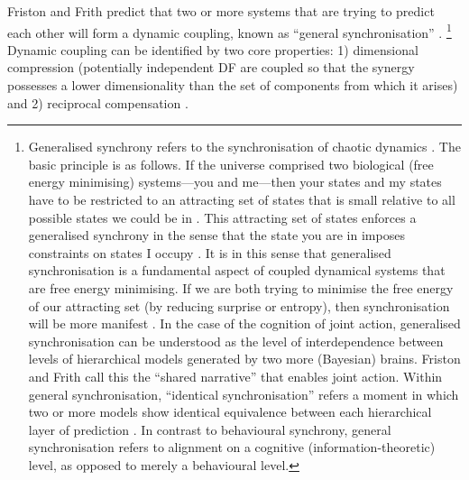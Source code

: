 \begin{CJK}{UTF8}{gbsn}
Friston and Frith predict that two or more systems that are trying to predict each other  will form a dynamic coupling, known as ``general synchronisation'' \citep{Friston2015}.
    \footnote{Generalised synchrony refers to the synchronisation of chaotic dynamics \citep{Barreto2003}.  The basic principle is as follows.  If the universe comprised two biological (free energy minimising) systems---you and me---then your states and my states have to be restricted to an attracting set of states that is small relative to all possible states we could be in \citep{Friston2015}.  This attracting set of states enforces a generalised synchrony in the sense that the state you are in imposes constraints on states I occupy \citep{Richardson2015}.  It is in this sense that generalised synchronisation is a fundamental aspect of coupled dynamical systems that are free energy minimising.  If we are both trying to minimise the free energy of our attracting set (by reducing surprise or entropy), then synchronisation will be more manifest \citep{Friston2015a}. In the case of the cognition of joint action, generalised synchronisation can be understood as the level of interdependence between levels of hierarchical models generated by two more (Bayesian) brains.  Friston and Frith call this the ``shared narrative'' that enables joint action.  Within general synchronisation, ``identical synchronisation'' refers a moment in which two or more models show identical equivalence between each hierarchical layer of prediction \citep{Friston2015}.   In contrast to behavioural synchrony, general synchronisation refers to alignment on a cognitive (information-theoretic) level, as opposed to merely a behavioural level.}
Dynamic coupling can be identified by two core properties:  1) dimensional compression (potentially independent DF are coupled so that the synergy possesses a lower dimensionality than the set of components from which it arises) and 2) reciprocal compensation \citep[the ability of one component of a synergy to react to changes in others][]{Turvey1978,Schmidt1990,Riley2011}.


\end{CJK}
